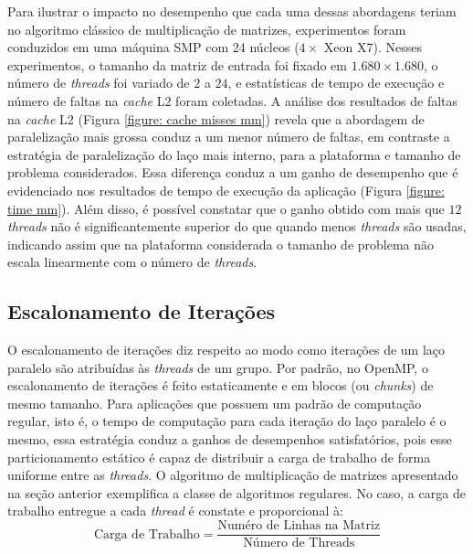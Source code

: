 \documentclass{SBCbookchapter}
\begin{document}
		Para ilustrar o impacto no desempenho que cada uma dessas abordagens
		teriam no algoritmo clássico de multiplicação de matrizes,
		experimentos foram conduzidos em uma máquina SMP com 24 núcleos ($4
		\times$ Xeon X7). Nesses experimentos, o tamanho da matriz de
		entrada foi fixado em $1.680 \times 1.680$, o número de
		\textit{threads} foi variado de $2$ a $24$, e estatísticas de tempo
		de execução e número de faltas na \textit{cache} L2 foram coletadas.
		A análise dos resultados de faltas na \textit{cache} L2 (Figura
		\ref{figure: cache misses mm}) revela que a abordagem de
		paralelização mais grossa conduz a um menor número de faltas, em
		contraste a estratégia de paralelização do laço mais interno, para a
		plataforma e tamanho de problema considerados. Essa diferença conduz
		a um ganho de desempenho que é evidenciado nos resultados de tempo
		de execução da aplicação (Figura \ref{figure: time mm}). Além disso,
		é possível constatar que o ganho obtido com mais que $12$
		\textit{threads} não é significantemente superior do que quando
		menos \textit{threads} são usadas, indicando assim que na
		plataforma considerada o tamanho de problema não escala linearmente
		com o número de \textit{threads}.

	\subsection{Escalonamento de Iterações}
	\label{subsection: escalonamento de iteracoes}

		O escalonamento de iterações diz respeito ao modo como iterações de
		um laço paralelo são atribuídas às \textit{threads} de um grupo. Por padrão,
		no OpenMP, o escalonamento de iterações é feito estaticamente e em
		blocos (ou \textit{chunks}) de mesmo tamanho. Para aplicações que
		possuem um padrão de computação regular, isto é, o tempo de
		computação para cada iteração do laço paralelo é o mesmo, essa
		estratégia conduz a ganhos de desempenhos satisfatórios, pois esse
		particionamento estático é capaz de distribuir a carga de trabalho
		de forma uniforme entre as \textit{threads}. O algoritmo de multiplicação de
		matrizes apresentado na seção anterior exemplifica a classe de
		algoritmos regulares. No caso, a carga de trabalho entregue a cada
		\textit{thread} é constate e proporcional à:
		\begin{equation}
			\text{Carga de Trabalho} = \dfrac{\text{Numéro de Linhas na Matriz}}%
			                                 {\text{Número de Threads}}
		\end{equation}
\end{document}

